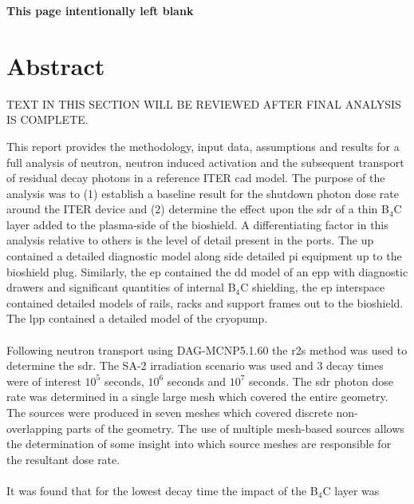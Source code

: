 \documentclass[12pt]{article}
\newcommand*{\blankpage}{%
\vspace*{\fill}
\begin{center}
 \centering \textbf{This page intentionally left blank}
\end{center}
\vspace{\fill}}
\begin{document}



\newpage
\blankpage

\newpage
\section*{Abstract}

TEXT IN THIS SECTION WILL BE REVIEWED AFTER FINAL ANALYSIS IS COMPLETE.


This report provides the methodology, input data, assumptions and results for a
full analysis of neutron, neutron induced activation and the subsequent
transport of residual decay photons in a reference ITER \gls{cad} model. The 
purpose of the analysis was to (1) establish a baseline result for the shutdown 
photon dose rate around the ITER device and (2) determine the effect upon the 
\gls{sdr} of a thin B$_4$C layer added to the plasma-side of the bioshield. A 
differentiating factor in this analysis relative to others is the level of 
detail present in the ports. The \gls{up} contained a detailed diagnostic model 
along side detailed \gls{pi} equipment up to the bioshield plug. Similarly, the 
\gls{ep} contained the \gls{dd} model of an \gls{epp} with diagnostic drawers 
and significant quantities of internal B$_4$C shielding, the \gls{ep} interspace
contained detailed models of rails, racks and support frames out to the 
bioshield. The \gls{lpp} contained a detailed model of the cryopump. 
\\
\\
Following neutron transport using DAG-MCNP5.1.60 the \gls{r2s} method was used 
to  determine the \gls{sdr}. The SA-2 irradiation scenario \cite{sa2_irradiation} was used and 3 decay
times were of interest $10^5$ seconds, $10^6$ seconds and 
$10^7$ seconds. The \gls{sdr} photon dose rate was determined in a 
single large mesh which covered the entire geometry. The sources were produced 
in seven meshes which covered discrete non-overlapping parts of the geometry. 
The use of multiple mesh-based sources allows the determination of some insight 
into which source meshes are responsible for the resultant dose rate.
\\
\\
It was found that for the lowest decay time the impact of the B$_4$C layer was 
\end{document}
